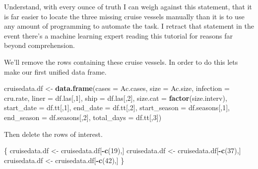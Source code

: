 \documentclass[
  11,
]{book}
\newenvironment{Shaded}{\begin{snugshade}}{\end{snugshade}}
\newcommand{\AttributeTok}[1]{\textcolor[rgb]{0.27,0.27,0.27}{#1}}
\newcommand{\DecValTok}[1]{\textcolor[rgb]{0.06,0.06,0.06}{#1}}
\newcommand{\FunctionTok}[1]{\textcolor[rgb]{0.27,0.27,0.27}{\textbf{#1}}}
\newcommand{\NormalTok}[1]{#1}
\newcommand{\OtherTok}[1]{\textcolor[rgb]{0.37,0.37,0.37}{#1}}
\newcommand{\SpecialCharTok}[1]{\textcolor[rgb]{0.43,0.43,0.43}{\textbf{#1}}}
\begin{document}
Understand, with every ounce of truth I can weigh against this statement, that it is far easier to locate the three missing cruise vessels manually than it is to use any amount of programming to automate the task. I retract that statement in the event there's a machine learning expert reading this tutorial for reasons far beyond comprehension.

We'll remove the rows containing these cruise vessels. In order to do this lets make our first unified data frame.

\begin{Shaded}
\begin{Highlighting}[]
\NormalTok{cruisedata.df }\OtherTok{\textless{}{-}} \FunctionTok{data.frame}\NormalTok{(}\AttributeTok{cases =}\NormalTok{ Ac.cases,}
                            \AttributeTok{size =}\NormalTok{ Ac.size,}
                            \AttributeTok{infection =}\NormalTok{ cru.rate,}
                            \AttributeTok{liner =}\NormalTok{ df.las[,}\DecValTok{1}\NormalTok{],}
                            \AttributeTok{ship =}\NormalTok{ df.las[,}\DecValTok{2}\NormalTok{],}
                            \AttributeTok{size.cat =} \FunctionTok{factor}\NormalTok{(size.interv),}
                            \AttributeTok{start\_date =}\NormalTok{ df.tt[,}\DecValTok{1}\NormalTok{],}
                            \AttributeTok{end\_date =}\NormalTok{ df.tt[,}\DecValTok{2}\NormalTok{],}
                            \AttributeTok{start\_season =}\NormalTok{ df.seasons[,}\DecValTok{1}\NormalTok{],}
                            \AttributeTok{end\_season =}\NormalTok{ df.seasons[,}\DecValTok{2}\NormalTok{],}
                            \AttributeTok{total\_days =}\NormalTok{ df.tt[,}\DecValTok{3}\NormalTok{])}
\end{Highlighting}
\end{Shaded}

Then delete the rows of interest.

\begin{Shaded}
\begin{Highlighting}[]
\NormalTok{\{}
\NormalTok{  cruisedata.df }\OtherTok{\textless{}{-}}\NormalTok{ cruisedata.df[}\SpecialCharTok{{-}}\FunctionTok{c}\NormalTok{(}\DecValTok{19}\NormalTok{),]}
\NormalTok{  cruisedata.df }\OtherTok{\textless{}{-}}\NormalTok{ cruisedata.df[}\SpecialCharTok{{-}}\FunctionTok{c}\NormalTok{(}\DecValTok{37}\NormalTok{),]}
\NormalTok{  cruisedata.df }\OtherTok{\textless{}{-}}\NormalTok{ cruisedata.df[}\SpecialCharTok{{-}}\FunctionTok{c}\NormalTok{(}\DecValTok{42}\NormalTok{),]}
\NormalTok{\}}
\end{Highlighting}
\end{Shaded}
\end{document}

